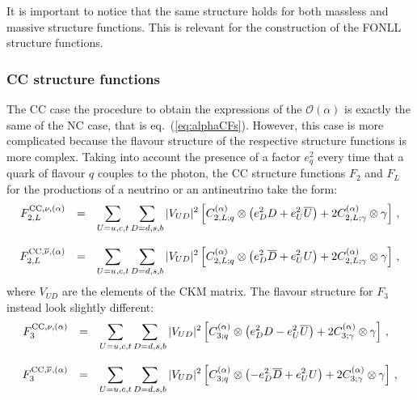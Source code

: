 It is important to notice that the same structure holds for both
massless and massive structure functions. This is relevant for the
construction of the FONLL structure functions.

\subsubsection{CC structure functions}

The CC case the procedure to obtain the expressions of the
$\mathcal{O}(\alpha)$ is exactly the same of the NC case, that is
eq.~(\ref{eq:alphaCFs}). However, this case is more complicated
because the flavour structure of the respective structure functions is
more complex. Taking into account the presence of a factor $e_q^2$
every time that a quark of flavour $q$ couples to the photon, the CC
structure functions $F_2$ and $F_L$ for the productions of a neutrino
or an antineutrino take the form:
\begin{equation}\label{compactNu}
\begin{array}{rcl}
F_{2,L}^{{\rm CC},\nu,(\alpha)} &=& \displaystyle
                              \sum_{U=u,c,t}\sum_{D=d,s,b}|V_{UD}|^2\left[C_{2,L;q}^{(\alpha)}\otimes\left(e_D^2D +e_U^2\overline{U}\right) +2 C_{2,L;\gamma}^{(\alpha)}\otimes\gamma\right]\,,\\
\\
F_{2,L}^{{\rm CC},\overline{\nu},(\alpha)} &=& \displaystyle
\sum_{U=u,c,t}\sum_{D=d,s,b}|V_{UD}|^2\left[C_{2,L;q}^{(\alpha)}\otimes\left(e_D^2\overline{D}
    +e_U^2U\right) +2 C_{2,L;\gamma}^{(\alpha)}\otimes\gamma\right]\,,
\end{array}
\end{equation}
where $V_{UD}$ are the elements of the CKM matrix. The flavour
structure for $F_3$ instead look slightly different:
\begin{equation}\label{compactNuF3}
\begin{array}{rcl}
F_3^{{\rm CC},\nu,(\alpha)} &=& \displaystyle
                              \sum_{U=u,c,t}\sum_{D=d,s,b}|V_{UD}|^2\left[C_{3;q}^{(\alpha)}\otimes\left(e_D^2D -e_U^2\overline{U}\right) +2 C_{3;\gamma}^{(\alpha)}\otimes\gamma\right]\,,\\
\\
F_3^{{\rm CC},\overline{\nu},(\alpha)} &=& \displaystyle
\sum_{U=u,c,t}\sum_{D=d,s,b}|V_{UD}|^2\left[C_{3;q}^{(\alpha)}\otimes\left(-e_D^2\overline{D}
    +e_U^2U\right) +2 C_{3;\gamma}^{(\alpha)}\otimes\gamma\right]\,,
\end{array}
\end{equation}

